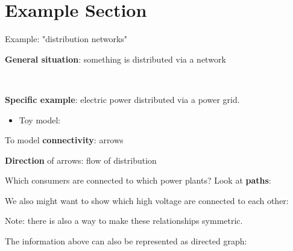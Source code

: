 \section{Example Section }

\begin{frame}[fragile]{Example: "distribution networks"}

\textbf{General situation}: something is distributed via a network

\

\textbf{Specific example}: electric power distributed via a power grid. 

\begin{itemize}
\item Toy model: 
\end{itemize}

\vfill
\vfill
\vfill
\vfill
\vfill
\vfill


\end{frame}

\begin{frame}[fragile]{}


To model \textbf{connectivity}: arrows

\textbf{Direction} of arrows: flow of distribution

\vfill \vfill \vfill \vfill \vfill \vfill \vfill \vfill \vfill 

\end{frame}

\begin{frame}[fragile]{}

Which consumers are connected to which power plants? Look at \textbf{paths}:


\vfill \vfill \vfill \vfill \vfill \vfill \vfill \vfill \vfill 
\end{frame}


\begin{frame}[fragile]{}

We also might want to show which high voltage are connected to each other:

\vfill \vfill \vfill \vfill \vfill \vfill \vfill \vfill \vfill 

Note: there is also a way to make these relationships symmetric.

\end{frame}


\begin{frame}[fragile]{}

The information above can also be represented as directed graph:

\vfill \vfill \vfill \vfill \vfill \vfill \vfill \vfill \vfill 

\end{frame}


